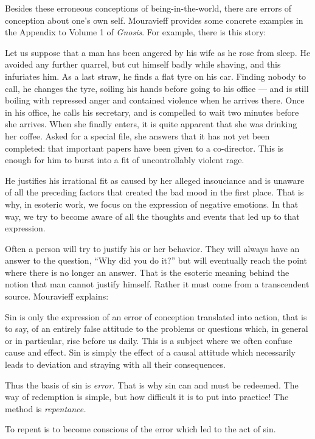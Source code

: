 Besides these erroneous conceptions of being-in-the-world, there are errors of conception about one's own self. Mouravieff provides some concrete examples in the Appendix to Volume 1 of \emph{Gnosis}. For example, there is this story:

\begin{quotex}
Let us suppose that a man has been angered by his wife as he rose from sleep. He avoided any further quarrel, but cut himself badly while shaving, and this infuriates him. As a last straw, he finds a flat tyre on his car. Finding nobody to call, he changes the tyre, soiling his hands before going to his office --- and is still boiling with repressed anger and contained violence when he arrives there. Once in his office, he calls his secretary, and is compelled to wait two minutes before she arrives. When she finally enters, it is quite apparent that she was drinking her coffee. Asked for a special file, she answers that it has not yet been completed: that important papers have been given to a co-director. This is enough for him to burst into a fit of uncontrollably violent rage.
\end{quotex}


He justifies his irrational fit as caused by her alleged insouciance and is unaware of all the preceding factors that created the bad mood in the first place. That is why, in esoteric work, we focus on the expression of negative emotions. In that way, we try to become aware of all the thoughts and events that led up to that expression.

Often a person will try to justify his or her behavior. They will always have an answer to the question, ``Why did you do it?'' but will eventually reach the point where there is no longer an answer. That is the esoteric meaning behind the notion that man cannot justify himself. Rather it must come from a transcendent source. Mouravieff explains:

\begin{quotationx}
Sin is only the expression of an error of conception translated into action, that is to say, of an entirely false attitude to the problems or questions which, in general or in particular, rise before us daily. This is a subject where we often confuse cause and effect. Sin is simply the effect of a causal attitude which necessarily leads to deviation and straying with all their consequences.

Thus the basis of sin is \emph{error.} That is why sin can and must be redeemed. The way of redemption is simple, but how difficult it is to put into practice! The method is \emph{repentance.}

To repent is to become conscious of the error which led to the act of sin.
\end{quotationx}


